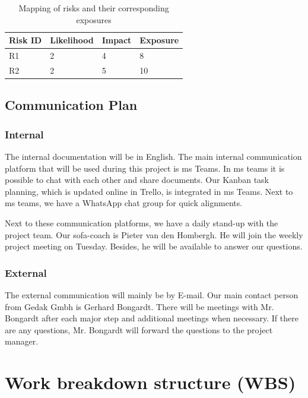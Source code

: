 \begin{table}[htp]
    \caption{Mapping of risks and their corresponding exposures}
    \center
    \begin{tabular}{@{}|l|l|l|l|@{}}
        \toprule
        \textbf{Risk ID} & \textbf{Likelihood} & \textbf{Impact} & \textbf{Exposure} \\
        \midrule
        R1      & 2          & 4      & 8        \\
        \midrule
        R2      & 2          & 5      & 10 \\
        \bottomrule
    \end{tabular}\label{tab:table4}
\end{table}

\subsection{Communication Plan}\label{subsec:communication-plan}

\subsubsection{Internal}

The internal documentation will be in English.
The main internal communication platform that will be used during this project is \ac{ms} Teams.
In \ac{ms} teams it is possible to chat with each other and share documents.
Our Kanban task planning, which is updated online in Trello, is integrated in \ac{ms} Teams.
Next to \ac{ms} teams, we have a WhatsApp chat group for quick alignments.

Next to these communication platforms, we have a daily stand-up with the project team.
Our \ac{sofa}-coach is Pieter van den Hombergh.
He will join the weekly project meeting on Tuesday.
Besides, he will be available to answer our questions.

\subsubsection{External}

The external communication will mainly be by E-mail.
Our main contact person from Gedak Gmbh is Gerhard Bongardt.
There will be meetings with Mr. Bongardt after each major step and additional meetings when necessary.
If there are any questions, Mr. Bongardt will forward the questions to the project manager.

\section{Work breakdown structure (WBS)}\label{sec:work-breakdown-structure-(wbs)}

